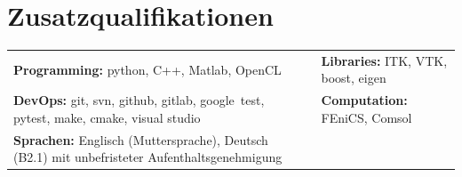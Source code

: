 \documentclass[german, print]{cv-style-wide-de}
\begin{document}
\section{Zusatzqualifikationen}
\begin{tabular}{p{} p{} p{} }
\textbf{Programming:} python, C++, Matlab, OpenCL & {} & \textbf{Libraries:} ITK, VTK, boost, eigen \\
%
\textbf{DevOps:} \hfill git, \hfill svn, \hfill github, \hfill gitlab, \hfill google~test, \hfill pytest, \hfill make, \hfill cmake, \hfill visual studio \hfill & {} & \textbf{Computation:} FEniCS, Comsol \\
%
%
 \textbf{Sprachen:} Englisch (Muttersprache), Deutsch (B2.1) mit unbefristeter Aufenthaltsgenehmigung & {} & {}
\end{tabular}





%
\end{document}
